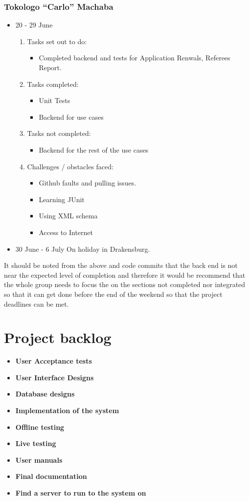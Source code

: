 \documentclass[12pt]{article}
\begin{document}
\subsubsection{Tokologo “Carlo” Machaba}
\begin{itemize}
	\item 20 - 29 June
	\begin{enumerate}
	\item Tasks set out to do:
	\begin{itemize}
		\item Completed backend and tests for Application Renwals, Referees Report.
	\end{itemize}
	\item Tasks completed:
	\begin{itemize}
		\item Unit Tests
		\item Backend for use cases
	\end{itemize}
	\item Tasks not completed:
	\begin{itemize}
		\item Backend for the rest of the use cases
	\end{itemize}	
	\item Challenges / obstacles faced:
	\begin{itemize}
		\item Github faults and pulling issues.
		\item Learning JUnit 
		\item Using XML schema
		\item Access to Internet
	\end{itemize}
	\end{enumerate}
	\item 30 June - 6 July On holiday in Drakensburg.	 
\end{itemize}

It should be noted from the above and code commits that the back end is not near the expected level of completion and therefore it would be recommend that the whole group needs to focus the on the sections not completed nor integrated so that it can get done before the end of the weekend so that the project deadlines can be met.
\section{Project backlog}

\begin{itemize}
\item \textbf{User Acceptance tests}
\item \textbf{User Interface Designs}
\item \textbf{Database designs}
\item \textbf{Implementation of the system}
\item \textbf{Offline testing}
\item \textbf{Live testing}
\item \textbf{User manuals}
\item \textbf{Final documentation}
\item \textbf{Find a server to run to the system on}


\end{itemize}
\end{document}
